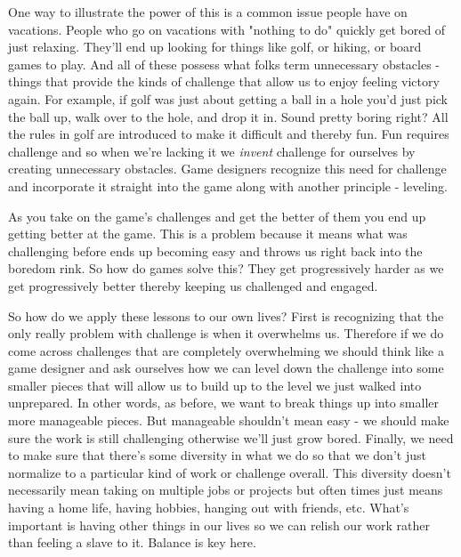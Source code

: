 \documentclass[11pt]{book}
\begin{document}
One way to illustrate the power of this is a common issue people have on vacations. People who go on vacations with "nothing to do" quickly get bored of just relaxing. They'll end up looking for things like golf, or hiking, or board games to play. And all of these possess what folks term unnecessary obstacles \cite{superbetter} - things that provide the kinds of challenge that allow us to enjoy feeling victory again. For example, if golf was just about getting a ball in a hole you'd just pick the ball up, walk over to the hole, and drop it in. Sound pretty boring right? All the rules in golf are introduced to make it difficult and thereby fun. Fun requires challenge and so when we're lacking it we \textit{invent} challenge for ourselves by creating unnecessary obstacles. Game designers recognize this need for challenge and incorporate it straight into the game along with another principle - leveling.
\newline

As you take on the game's challenges and get the better of them you end up getting better at the game. This is a problem because it means what was challenging before ends up becoming easy and throws us right back into the boredom rink. So how do games solve this? They get progressively harder as we get progressively better thereby keeping us challenged and engaged.
\newline

So how do we apply these lessons to our own lives? First is recognizing that the only really problem with challenge is when it overwhelms us. Therefore if we do come across challenges that are completely overwhelming we should think like a game designer and ask ourselves how we can level down the challenge into some smaller pieces that will allow us to build up to the level we just walked into unprepared. In other words, as before, we want to break things up into smaller more manageable pieces. But manageable shouldn't mean easy - we should make sure the work is still challenging otherwise we'll just grow bored. Finally, we need to make sure that there's some diversity in what we do so that we don't just normalize to a particular kind of work or challenge overall. This diversity doesn't necessarily mean taking on multiple jobs or projects but often times just means having a home life, having hobbies, hanging out with friends, etc. What's important is having other things in our lives so we can relish our work rather than feeling a slave to it. Balance is key here. 
\newline
\end{document}
